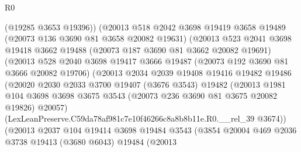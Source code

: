 \begin{lexlean}{R0}
\begin{coremodule}
                        (@19285 @3653 @19396))
                      (@20013
                        @518
                        @2042
                        @3698
                        @19419
                        @3658
                        @19489
                        (@20073 @136 @3690 @81 @3658 @20082 @19631)
                        (@20013
                          @523
                          @2041
                          @3698
                          @19418
                          @3662
                          @19488
                          (@20073 @187 @3690 @81 @3662 @20082 @19691)
                          (@20013
                            @528
                            @2040
                            @3698
                            @19417
                            @3666
                            @19487
                            (@20073 @192 @3690 @81 @3666 @20082 @19706)
                            (@20013
                              @2034
                              @2039
                              @19408
                              @19416
                              @19482
                              @19486
                              (@20020
                                @2030
                                @2033
                                @3700
                                @19407
                                (@3676 @3543)
                                @19482
                                (@20013
                                  @1981
                                  @104
                                  @3698
                                  @3698
                                  @3675
                                  @3543
                                  (@20073 @236 @3690 @81 @3675 @20082 @19826)
                                  @20057)
                                (LexLeanPreserve.C59da78af981c7e10f46266c8a8b8b11e.R0.__rel_39
                                  @3674))
                              (@20013
                                @2037
                                @104
                                @19414
                                @3698
                                @19484
                                @3543
                                (@3854
                                  @20004
                                  @469
                                  @2036
                                  @3738
                                  @19413
                                  (@3680 @6043)
                                  @19484
                                  (@20013

\end{coremodule}
\end{lexlean}
